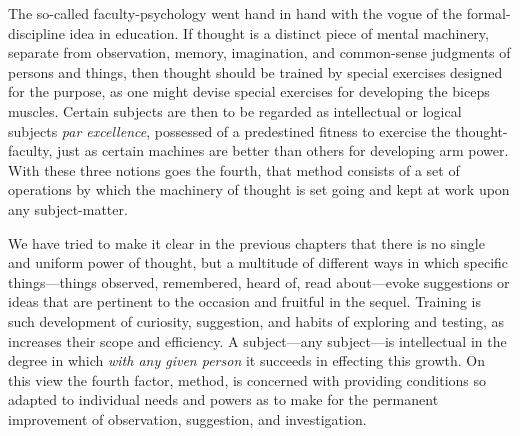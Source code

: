 \documentclass[letterpaper]{book}
\begin{document}

The so-called faculty-psychology went hand in hand with the vogue of the
formal-discipline idea in education. If thought is a distinct piece of
mental machinery, separate from observation, memory, imagination, and
common-sense judgments of persons and things, then thought should be
trained by special exercises designed for the purpose, as one might
devise special exercises for developing the biceps muscles. Certain
subjects are then to be regarded as intellectual or logical subjects
\emph{par excellence}, possessed of a predestined fitness to exercise
the thought-faculty, just as certain machines are better than others for
developing arm power. With these three notions goes the fourth, that
method consists of a set of operations by which the machinery of thought
is set going and kept at work upon any subject-matter.


We have tried to make it clear in the previous chapters that there is no
single and uniform power of thought, but a multitude of different ways
in which specific things---things observed, remembered, heard of, read
about---evoke suggestions or ideas that are pertinent to the occasion
and fruitful in the sequel. Training is such development of curiosity,
suggestion, and habits of exploring and testing, as increases their
scope
and efficiency. A subject---any subject---is intellectual in the degree
in which \emph{with any given person} it succeeds in effecting this
growth. On this view the fourth factor, method, is concerned with
providing conditions so adapted to individual needs and powers as to
make for the permanent improvement of observation, suggestion, and
investigation.

\end{document}
